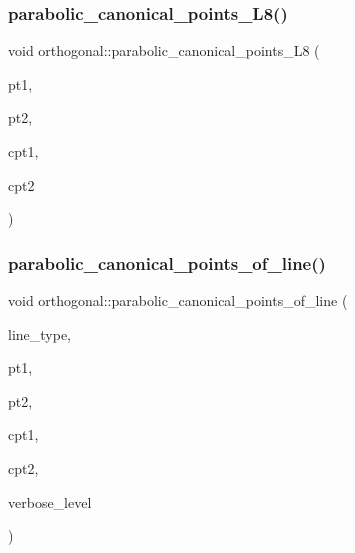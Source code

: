 \subsubsection{\texorpdfstring{parabolic\+\_\+canonical\+\_\+points\+\_\+\+L8()}{parabolic\_canonical\_points\_L8()}}
{\footnotesize\ttfamily void orthogonal\+::parabolic\+\_\+canonical\+\_\+points\+\_\+\+L8 (\begin{DoxyParamCaption}\item[{\mbox{\hyperlink{galois_8h_a09fddde158a3a20bd2dcadb609de11dc}{I\+NT}}}]{pt1,  }\item[{\mbox{\hyperlink{galois_8h_a09fddde158a3a20bd2dcadb609de11dc}{I\+NT}}}]{pt2,  }\item[{\mbox{\hyperlink{galois_8h_a09fddde158a3a20bd2dcadb609de11dc}{I\+NT}} \&}]{cpt1,  }\item[{\mbox{\hyperlink{galois_8h_a09fddde158a3a20bd2dcadb609de11dc}{I\+NT}} \&}]{cpt2 }\end{DoxyParamCaption})}

\mbox{\label{classorthogonal_a7f1b4034dcfc0c22f06242b179466594}} 
\subsubsection{\texorpdfstring{parabolic\+\_\+canonical\+\_\+points\+\_\+of\+\_\+line()}{parabolic\_canonical\_points\_of\_line()}}
{\footnotesize\ttfamily void orthogonal\+::parabolic\+\_\+canonical\+\_\+points\+\_\+of\+\_\+line (\begin{DoxyParamCaption}\item[{\mbox{\hyperlink{galois_8h_a09fddde158a3a20bd2dcadb609de11dc}{I\+NT}}}]{line\+\_\+type,  }\item[{\mbox{\hyperlink{galois_8h_a09fddde158a3a20bd2dcadb609de11dc}{I\+NT}}}]{pt1,  }\item[{\mbox{\hyperlink{galois_8h_a09fddde158a3a20bd2dcadb609de11dc}{I\+NT}}}]{pt2,  }\item[{\mbox{\hyperlink{galois_8h_a09fddde158a3a20bd2dcadb609de11dc}{I\+NT}} \&}]{cpt1,  }\item[{\mbox{\hyperlink{galois_8h_a09fddde158a3a20bd2dcadb609de11dc}{I\+NT}} \&}]{cpt2,  }\item[{\mbox{\hyperlink{galois_8h_a09fddde158a3a20bd2dcadb609de11dc}{I\+NT}}}]{verbose\+\_\+level }\end{DoxyParamCaption})}

